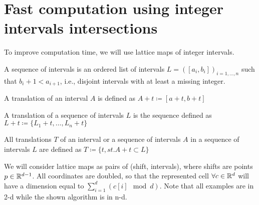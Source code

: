 \documentclass[runningheads]{llncs}
\begin{document}


    \section{Fast computation using integer intervals intersections}

    To improve computation time, we will use lattice maps of integer intervals.

    \begin{definition}
        A sequence of intervals is an ordered list of intervals $L = ([a_i,b_i])_{i=1,\ldots,n}$ such that $b_i + 1 < a_{i+1}$, i.e., disjoint intervals with at least a missing integer.
    \end{definition}

    \begin{definition}
        A translation of an interval $A$ is defined as $A+t \coloneqq [a+t, b+t]$
    \end{definition}

    \begin{definition}
        A translation of a sequence of intervals $L$ is the sequence defined as $L+t \coloneqq \{L_1+t,\ldots,L_n+t\}$
    \end{definition}

    \begin{definition}
        All translations $T$ of an interval or a sequence of intervals $A$ in a sequence of intervals $L$ are defined as $ T \coloneqq \{ t, st. A+t \subset L\}$
    \end{definition}

    We will consider lattice maps as pairs of (shift, intervals), where shifts are points $p \in \mathbb{R}^{d-1}$. All coordinates are doubled, so that the represented cell $\forall c \in \mathbb{R}^d$ will have a dimension equal to $\sum_{i=1}^d \left(c[i]\mod d\right)$. Note that all examples are in 2-d while the shown algorithm is in n-d.
\end{document}
